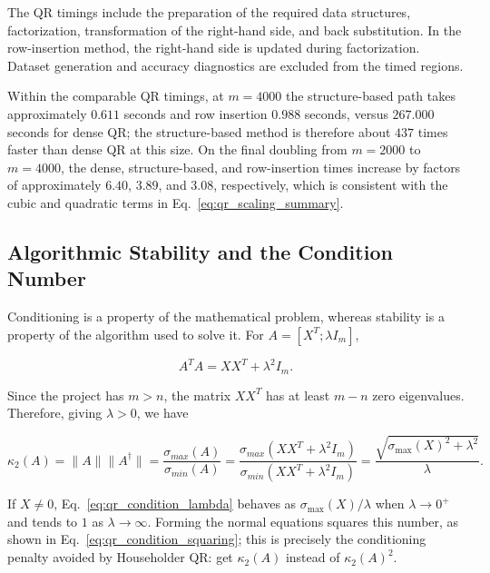 \noindent The QR timings include the preparation of the required data
structures, factorization, transformation of the right-hand side, and
back substitution. In the row-insertion method, the right-hand side is
updated during factorization. Dataset generation and accuracy diagnostics
are excluded from the timed regions.

\noindent Within the comparable QR timings, at $m=4000$ the structure-based
path takes approximately $0.611$ seconds and row insertion $0.988$ seconds,
versus $267.000$ seconds for dense QR; the structure-based method is therefore
about $437$ times faster than dense QR at this size. On the final doubling from
$m=2000$ to $m=4000$, the dense, structure-based, and row-insertion times
increase by factors of approximately $6.40$, $3.89$, and $3.08$, respectively,
which is consistent with the cubic and quadratic terms in
Eq.~\eqref{eq:qr_scaling_summary}.

\subsection{Algorithmic Stability and the Condition Number}
\label{sec:qr_stability}

\noindent Conditioning is a property of the mathematical problem, whereas
stability is a property of the algorithm used to solve it. For
$A=[X^T;\lambda I_m]$,

\begin{equation}
    A^T A=XX^T+\lambda^2I_m.
\end{equation}

\noindent Since the project has $m>n$, the matrix $XX^T$ has at least $m-n$
zero eigenvalues. Therefore, giving $\lambda>0$, we have

\begin{equation}
\label{eq:qr_condition_lambda}
    \kappa_2(A)
    = \|A\|\|A^\dagger\|
    = \frac{\sigma_{max}(A)}{\sigma_{min}(A)}
    = \frac{\sigma_{max}(XX^T+\lambda^2I_m)}{\sigma_{min}(XX^T+\lambda^2I_m)}
    =\frac{\sqrt{\sigma_{\max}(X)^{2}+\lambda^2}}{\lambda}.
\end{equation}

\noindent If $X\neq0$, Eq.~\eqref{eq:qr_condition_lambda} behaves as
$\sigma_{\max}(X)/\lambda$ when $\lambda\to0^+$ and tends to $1$ as
$\lambda\to\infty$. Forming the normal equations squares this number, as
shown in Eq.~\eqref{eq:qr_condition_squaring}; this is precisely the
conditioning penalty avoided by Householder QR: get $\kappa_2(A)$ instead of $\kappa_2(A)^2$.

